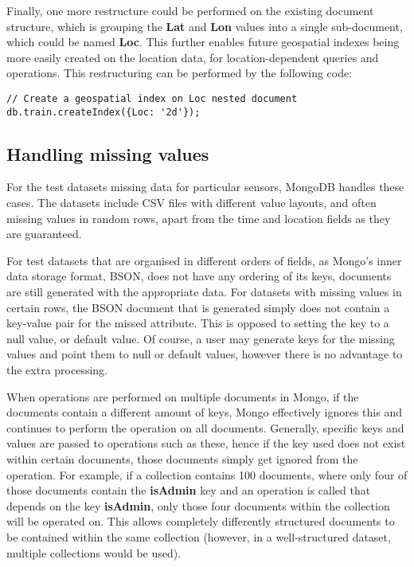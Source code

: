 \documentclass[a4paper,11pt]{article}
\begin{document}
Finally, one more restructure could be performed on the existing document structure, which is grouping the \textbf{Lat}
and \textbf{Lon} values into a single sub-document, which could be named \textbf{Loc}. This further enables future
geospatial indexes being more easily created on the location data, for location-dependent queries and operations.
This restructuring can be performed by the following code:

\begin{lstlisting}
// Create a geospatial index on Loc nested document
db.train.createIndex({Loc: '2d'});
\end{lstlisting}


\subsection{Handling missing values} %
\label{sub:handling_missing_values}

For the test datasets missing data for particular sensors, MongoDB handles these cases. The datasets include
CSV files with different value layouts, and often missing values in random rows, apart from the time and location fields
as they are guaranteed.

For test datasets that are organised in different orders of fields, as Mongo's inner data storage format, BSON, does
not have any ordering of its keys, documents are still generated with the appropriate data. For datasets with missing
values in certain rows, the BSON document that is generated simply does not contain a key-value pair for the missed
attribute. This is opposed to setting the key to a null value, or default value. Of course, a user may generate keys
for the missing values and point them to null or default values, however there is no advantage to the extra processing.

When operations are performed on multiple documents in Mongo, if the documents contain a different amount of keys, Mongo
effectively ignores this and continues to perform the operation on all documents. Generally, specific keys and values
are passed to operations such as these, hence if the key used does not exist within certain documents, those documents
simply get ignored from the operation. For example, if a collection contains 100 documents, where only four of those
documents contain the \textbf{isAdmin} key and an operation is called that depends on the key \textbf{isAdmin}, only
those four documents within the collection will be operated on. This allows completely differently structured documents
to be contained within the same collection (however, in a well-structured dataset, multiple collections would be used).
\end{document}
